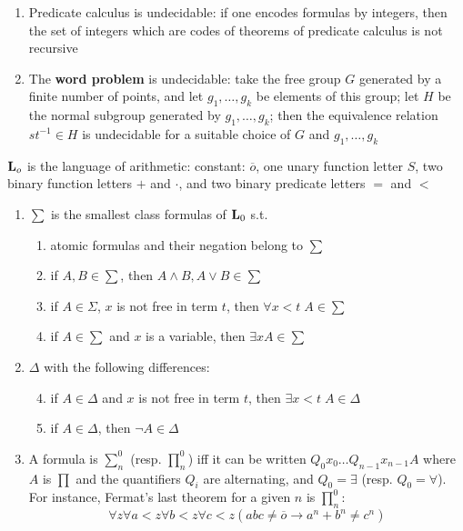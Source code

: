 \documentclass[11pt]{article}
\begin{document}
\begin{examplle}[]
\begin{enumerate}
\item Predicate calculus is undecidable: if one encodes formulas by integers, then
the set of integers which are codes of theorems of predicate calculus is not
recursive
\item The \textbf{word problem} is undecidable: take the free group \(G\) generated by a
finite number of points, and let \(g_1,\dots,g_k\) be elements of this group;
let \(H\) be the normal subgroup generated by \(g_1,\dots,g_k\); then the
equivalence relation \(st^{-1}\in H\) is undecidable for a suitable choice of
\(G\) and \(g_1,\dots,g_k\)
\end{enumerate}
\end{examplle}

\begin{definition}[]
\(\operatorname{\textbf{L}}_o\) is the language of arithmetic: constant: \(\overline{o}\), one unary
function letter \(S\), two binary function letters \(+\) and \(\cdot\), and two binary
predicate letters \(=\) and \(<\)
\begin{enumerate}
\item \(\sum\) is the smallest class formulas of \(\operatorname{\textbf{L}}_0\) s.t.
\begin{enumerate}
\item atomic formulas and their negation belong to \(\sum\)
\item if \(A,B\in\sum\), then \(A\wedge B,A\vee B\in\sum\)
\item if \(A\in\Sigma\), \(x\) is not free in term \(t\), then \(\forall x<t\; A\in\sum\)
\item if \(A\in\sum\) and \(x\) is a variable, then \(\exists xA\in\sum\)
\end{enumerate}
\item \(\Delta\) with the following differences:
\begin{enumerate}
\setcounter{enumii}{3}
\item if \(A\in\Delta\) and \(x\) is not free in term \(t\), then \(\exists
      x<t\; A\in\Delta\)
\item if \(A\in\Delta\), then \(\neg A\in\Delta\)
\end{enumerate}
\item A formula is \(\sum^0_n\) (resp. \(\prod_n^0\)) iff it can be written 
\(Q_0x_0\dots Q_{n-1}x_{n-1}A\) where \(A\) is \(\prod\) and the quantifiers \(Q_i\)
are alternating, and \(Q_0=\exists\) (resp. \(Q_0=\forall\)). For instance,
Fermat's last theorem for a given \(n\) is \(\prod_n^0\):
\begin{equation*}
\forall z\forall a<z\forall b<z\forall c<z(abc\neq\overline{o}\to
a^n+b^n\neq c^n)
\end{equation*}
\end{enumerate}
\end{definition}
\end{document}
